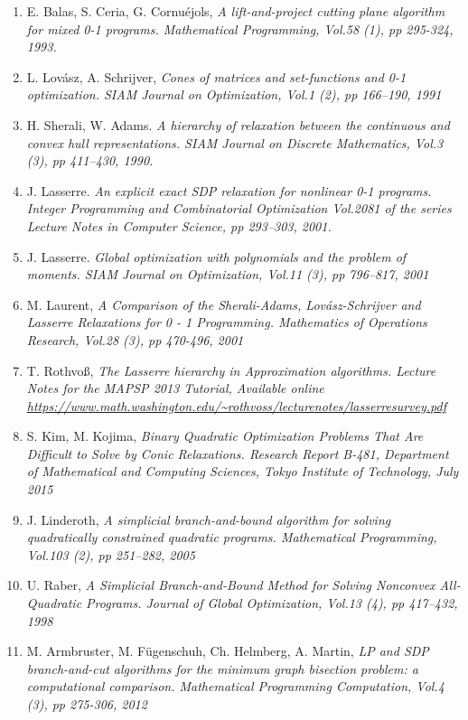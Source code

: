 \documentclass[12pt]{book}
\theoremstyle{definition}
\begin{document}
\begin{enumerate}
\item E. Balas, S. Ceria, G. Cornuéjols, \it A lift-and-project cutting plane algorithm
for mixed 0-1 programs. \rm Mathematical Programming, Vol.58 (1), pp 295-324, 1993.
\label{BalasLiftandProjectCuttingPlane}
%
\item L. Lovász, A. Schrijver, \it Cones of matrices and set-functions and 0-1 optimization. \rm
SIAM Journal on Optimization, Vol.1 (2), pp 166–190, 1991
\label{LovaszSchriverHrierarchy}
%
\item H. Sherali, W. Adams. \it A hierarchy of relaxation between the continuous
and convex hull representations. \rm SIAM Journal on Discrete Mathematics, Vol.3 (3), pp 411–430, 1990.
\label{SheraliAdamsHierarchy}
%
\item  J. Lasserre. \it An explicit exact SDP relaxation for nonlinear 0-1 programs. \rm Integer Programming and Combinatorial Optimization
Vol.2081 of the series Lecture Notes in Computer Science, pp 293–303, 2001.
\label{LasserreExplicitExactSDP}
%
\item  J. Lasserre. \it Global optimization with polynomials and the problem of moments. \rm
SIAM Journal on Optimization,  Vol.11 (3), pp 796–817, 2001
\label{LasserreProblemOfMoments}
%
\item M. Laurent, \it A Comparison of the Sherali-Adams, Lovász-Schrijver and Lasserre Relaxations for 0 - 1 Programming. \rm Mathematics of Operations Research, Vol.28 (3), pp 470-496, 2001
\label{LaurentComparisonOfHierarchies}
% 
\item T. Rothvoß, \it The Lasserre hierarchy in Approximation algorithms. \rm
Lecture Notes for the MAPSP 2013 Tutorial, Available online
\url{https://www.math.washington.edu/~rothvoss/lecturenotes/lasserresurvey.pdf}
\label{RothLassereSurvey}
%
\item S. Kim, M. Kojima, \it Binary Quadratic Optimization Problems
That Are Difficult to Solve by Conic Relaxations. \rm 
Research Report B-481, Department of Mathematical
and Computing Sciences, Tokyo Institute of Technology, July 2015
\label{KimKojimaDifficultBinaryOptimProblems}




\item J. Linderoth, \it A simplicial branch-and-bound algorithm for solving quadratically constrained quadratic programs. \rm 
Mathematical Programming, Vol.103 (2), pp 251–282, 2005
\label{LinderothSimplicialBranchAndBound}
%
\item U. Raber, \it A Simplicial Branch-and-Bound Method for Solving Nonconvex All-Quadratic Programs. \rm
Journal of Global Optimization, Vol.13 (4), pp 417–432, 1998
\label{RaberSimplicialBranchAndBound}
%
\item M. Armbruster, M. Fügenschuh, Ch. Helmberg, A. Martin, \it LP and SDP branch-and-cut algorithms for the minimum graph bisection problem: a computational comparison. \rm Mathematical Programming Computation, Vol.4 (3), pp 275-306, 2012
\label{ComparativeBNBStudyForGP}






\end{enumerate}
\end{document}
